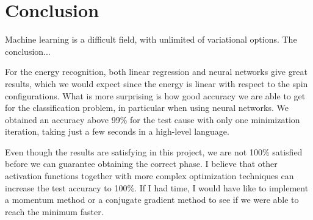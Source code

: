 \section{Conclusion} \label{sec:conclusion}
Machine learning is a difficult field, with unlimited of variational options. The conclusion...

For the energy recognition, both linear regression and neural networks give great results, which we would expect since the energy is linear with respect to the spin configurations. What is more surprising is how good accuracy we are able to get for the classification problem, in particular when using neural networks. We obtained an accuracy above 99\% for the test cause with only one minimization iteration, taking just a few seconds in a high-level language.

Even though the results are satisfying in this project, we are not 100\% satisfied before we can guarantee obtaining the correct phase. I believe that other activation functions together with more complex optimization techniques can increase the test accuracy to 100\%. If I had time, I would have like to implement a momentum method or a conjugate gradient method to see if we were able to reach the minimum faster. 